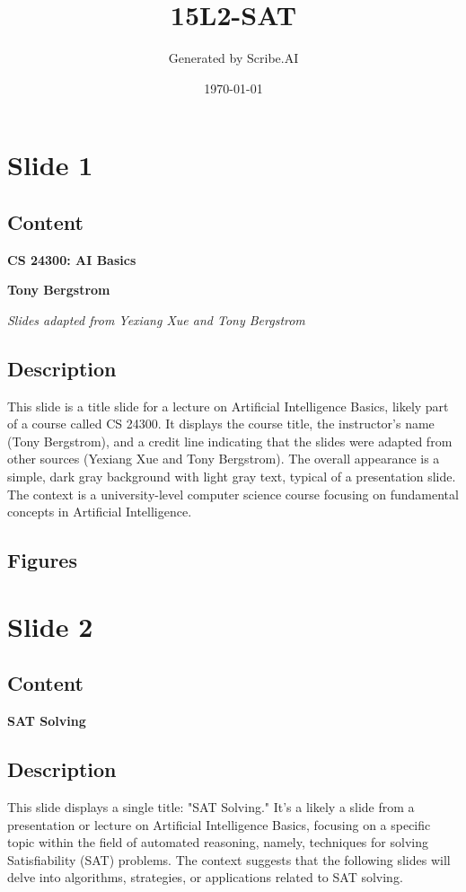 \documentclass{article}%
\title{15L2{-}SAT}%
\author{Generated by Scribe.AI}%
\date{\today}%
\begin{document}
%
\normalsize%
\maketitle%
\section{Slide 1}%
\label{sec:Slide1}%
\subsection{Content}%

\textbf{CS 24300: AI Basics}

\textbf{Tony Bergstrom}

\textit{Slides adapted from Yexiang Xue and Tony Bergstrom}
%
\subsection{Description}%
This slide is a title slide for a lecture on Artificial Intelligence Basics, likely part of a course called CS 24300.  It displays the course title, the instructor's name (Tony Bergstrom), and a credit line indicating that the slides were adapted from other sources (Yexiang Xue and Tony Bergstrom).  The overall appearance is a simple, dark gray background with light gray text, typical of a presentation slide. The context is a university-level computer science course focusing on fundamental concepts in Artificial Intelligence.%
\subsection{Figures}%
\begin{figure}[H]%
\centering%
\end{figure}

%
\newpage%
\section{Slide 2}%
\label{sec:Slide2}%
\subsection{Content}%

\textbf{SAT Solving}
%
\subsection{Description}%
This slide displays a single title: "SAT Solving."  It's a likely a slide from a presentation or lecture on Artificial Intelligence Basics, focusing on a specific topic within the field of automated reasoning, namely, techniques for solving Satisfiability (SAT) problems.  The context suggests that the following slides will delve into algorithms, strategies, or applications related to SAT solving.%
\end{document}
